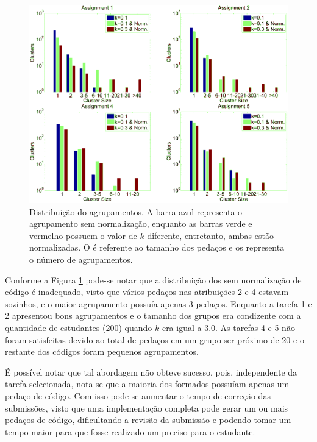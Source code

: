 		\begin{figure}
			\centering
			\includegraphics[width=0.7\linewidth]{imagem/clusteringPerformance}
			\caption{Distribuição do agrupamentos. A barra azul representa o agrupamento
				sem normalização, enquanto as barras verde e vermelho possuem o valor
				de $k$ diferente, entretanto, ambas estão normalizadas. O
				 é referente ao tamanho dos pedaços e os
				 representa o número de agrupamentos.}
			\label{fig:clusteringPerformance}
		\end{figure}
	    
		Conforme a Figura \ref{fig:clusteringPerformance} pode-se notar que a
		distribuição dos  sem normalização de código é inadequado,
		visto que vários pedaços nas atribuições 2 e 4 estavam sozinhos, e o maior
		agrupamento possuía apenas 3 pedaços. Enquanto a tarefa 1 e 2 apresentou
		bons agrupamentos e o tamanho dos grupos era condizente com a quantidade de
		estudantes (200) quando $k$ era igual a 3.0. As tarefas 4 e 5 não foram
		satisfeitas devido ao total de pedaços em um grupo ser próximo de 20 e o
		restante dos códigos foram pequenos agrupamentos.
		
		É possível notar que tal abordagem não obteve sucesso, pois, independente da
		tarefa selecionada, nota-se que a maioria dos  formados
		possuíam apenas um pedaço de código. Com isso pode-se aumentar o tempo de
		correção das submissões, visto que uma implementação completa pode gerar um
		ou mais pedaços de código, dificultando a revisão da submissão e podendo tomar
		um tempo maior para que fosse realizado um  preciso para o
		estudante.